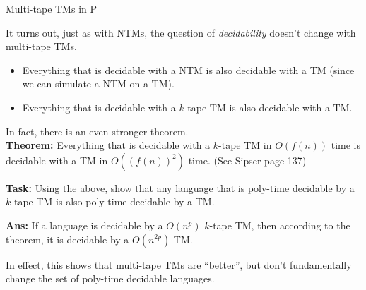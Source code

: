 \documentclass{beamer}
\begin{document}
\begin{frame}{Multi-tape TMs in P}

It turns out, just as with NTMs, the question of \textit{decidability} doesn't change with multi-tape TMs.
\pause
\begin{itemize}
    \item Everything that is decidable with a NTM is also decidable with a TM (since we can simulate a NTM on a TM).
    \item Everything that is decidable with a $k$-tape TM is also decidable with a TM.
\end{itemize}

\pause

In fact, there is an even stronger theorem.\\

\textbf{Theorem:} Everything that is decidable with a $k$-tape TM in $O(f(n))$ time is decidable with a TM in $O((f(n))^2)$ time. (See Sipser page 137)

\vspace{2mm} \pause

\textbf{Task:} Using the above, show that any language that is poly-time decidable by a $k$-tape TM is also poly-time decidable by a TM.

\pause

\textbf{Ans:} If a language is decidable by a $O(n^p)$ $k$-tape TM, then according to the theorem, it is decidable by a $O(n^{2p})$ TM.

\vspace{2mm} \pause

In effect, this shows that multi-tape TMs are ``better'', but don't fundamentally change the set of poly-time decidable languages.


\end{frame}
\end{document}

